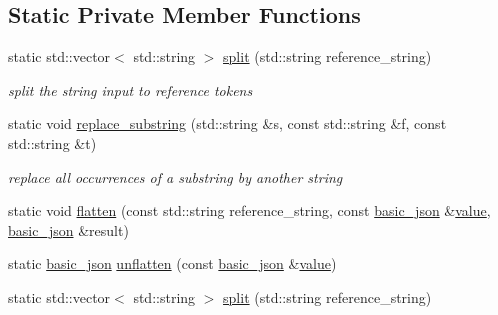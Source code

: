 \subsection*{Static Private Member Functions}
\begin{DoxyCompactItemize}
\item 
\hypertarget{classnlohmann_1_1basic__json_1_1json__pointer_ae31c0fb8a022f6e270a8ff0ea90358b3_ae31c0fb8a022f6e270a8ff0ea90358b3}{static std\-::vector$<$ std\-::string $>$ \hyperlink{classnlohmann_1_1basic__json_1_1json__pointer_ae31c0fb8a022f6e270a8ff0ea90358b3_ae31c0fb8a022f6e270a8ff0ea90358b3}{split} (std\-::string reference\-\_\-string)}\label{classnlohmann_1_1basic__json_1_1json__pointer_ae31c0fb8a022f6e270a8ff0ea90358b3_ae31c0fb8a022f6e270a8ff0ea90358b3}

\begin{DoxyCompactList}\small\item\em split the string input to reference tokens \end{DoxyCompactList}\item 
static void \hyperlink{classnlohmann_1_1basic__json_1_1json__pointer_a414bce1ecc972c4f036f6edd021c70cf_a414bce1ecc972c4f036f6edd021c70cf}{replace\-\_\-substring} (std\-::string \&s, const std\-::string \&f, const std\-::string \&t)
\begin{DoxyCompactList}\small\item\em replace all occurrences of a substring by another string \end{DoxyCompactList}\item 
static void \hyperlink{classnlohmann_1_1basic__json_1_1json__pointer_af9b39e7f59529e9496a2b84d07ae1e17_af9b39e7f59529e9496a2b84d07ae1e17}{flatten} (const std\-::string reference\-\_\-string, const \hyperlink{classnlohmann_1_1basic__json}{basic\-\_\-json} \&\hyperlink{classnlohmann_1_1basic__json_a0a2cbbd95862a623e7dc5c37e67dead0_a0a2cbbd95862a623e7dc5c37e67dead0}{value}, \hyperlink{classnlohmann_1_1basic__json}{basic\-\_\-json} \&result)
\item 
static \hyperlink{classnlohmann_1_1basic__json}{basic\-\_\-json} \hyperlink{classnlohmann_1_1basic__json_1_1json__pointer_a16cb91da82183ec5e87d90b4599591b2_a16cb91da82183ec5e87d90b4599591b2}{unflatten} (const \hyperlink{classnlohmann_1_1basic__json}{basic\-\_\-json} \&\hyperlink{classnlohmann_1_1basic__json_a0a2cbbd95862a623e7dc5c37e67dead0_a0a2cbbd95862a623e7dc5c37e67dead0}{value})
\item 
\hypertarget{classnlohmann_1_1basic__json_1_1json__pointer_ae31c0fb8a022f6e270a8ff0ea90358b3_ae31c0fb8a022f6e270a8ff0ea90358b3}{static std\-::vector$<$ std\-::string $>$ \hyperlink{classnlohmann_1_1basic__json_1_1json__pointer_ae31c0fb8a022f6e270a8ff0ea90358b3_ae31c0fb8a022f6e270a8ff0ea90358b3}{split} (std\-::string reference\-\_\-string)}\label{classnlohmann_1_1basic__json_1_1json__pointer_ae31c0fb8a022f6e270a8ff0ea90358b3_ae31c0fb8a022f6e270a8ff0ea90358b3}


\end{DoxyCompactItemize}
